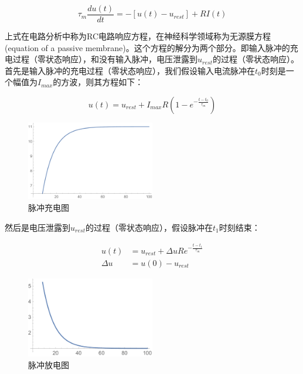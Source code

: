 \documentclass[12pt, a4paper, oneside]{ctexbook}
\begin{document}
\begin{equation}
    \tau _m\frac{du(t)}{dt}= -[u(t)-u_{rest}] + RI(t)
    \label{微分方程}
\end{equation}

上式在电路分析中称为RC电路响应方程，在神经科学领域称为无源膜方程(equation of a passive membrane)。这个方程的解分为两个部分。即输入脉冲的充电过程（零状态响应），和没有输入脉冲，电压泄露到$u_{rest}$的过程（零状态响应）。首先是输入脉冲的充电过程（零状态响应），我们假设输入电流脉冲在$t_0$时刻是一个幅值为$I_{max}$的方波，则其方程如下：

\begin{equation}
    u(t)=u_{rest}+I_{max}R(1-e^{-\frac{t-t_0}{\tau_m}})
    \label{零状态响应}
\end{equation}

\begin{figure}[H]
    \centering
    \includegraphics[width=0.5\textwidth]{脉冲充电图.pdf}
    \caption{脉冲充电图}
\end{figure} 

然后是电压泄露到$u_{rest}$的过程（零状态响应），假设脉冲在$t_1$时刻结束：

\begin{equation}
    \begin{aligned}
        u(t)&=u_{rest}+\Delta u Re^{-\frac{t-t_1}{\tau_m}}\\ \Delta u&=u(0)-u_{rest}
    \end{aligned}
    \label{零输入响应}
\end{equation}

\begin{figure}[H]
    \centering
    \includegraphics[width=0.5\textwidth]{脉冲放电图.pdf}
    \caption{脉冲放电图}
\end{figure} 
\end{document}
